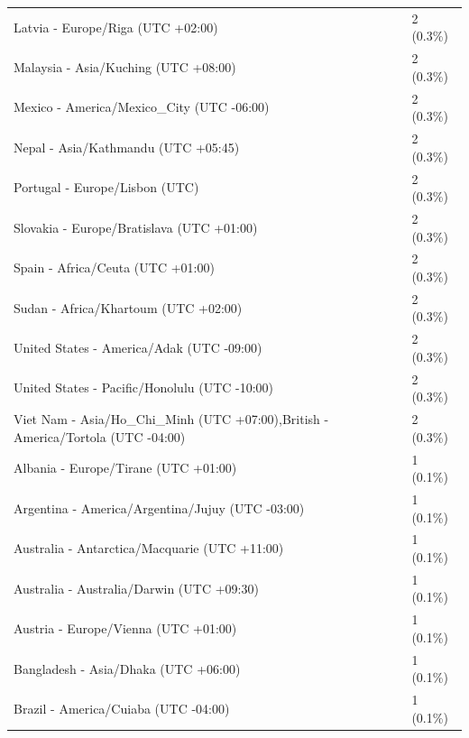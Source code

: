 \begin{appendix}
\begin{table}
{\begin{tabular}[t]{ll}
\hspace{1em}Latvia - Europe/Riga (UTC +02:00) & 2 (0.3\%)\\
\hspace{1em}Malaysia - Asia/Kuching (UTC +08:00) & 2 (0.3\%)\\
\addlinespace
\hspace{1em}Mexico - America/Mexico\_City (UTC -06:00) & 2 (0.3\%)\\
\hspace{1em}Nepal - Asia/Kathmandu (UTC +05:45) & 2 (0.3\%)\\
\hspace{1em}Portugal - Europe/Lisbon (UTC) & 2 (0.3\%)\\
\hspace{1em}Slovakia - Europe/Bratislava (UTC +01:00) & 2 (0.3\%)\\
\hspace{1em}Spain - Africa/Ceuta (UTC +01:00) & 2 (0.3\%)\\
\addlinespace
\hspace{1em}Sudan - Africa/Khartoum (UTC +02:00) & 2 (0.3\%)\\
\hspace{1em}United States - America/Adak (UTC -09:00) & 2 (0.3\%)\\
\hspace{1em}United States - Pacific/Honolulu (UTC -10:00) & 2 (0.3\%)\\
\hspace{1em}Viet Nam - Asia/Ho\_Chi\_Minh (UTC +07:00),British - America/Tortola (UTC -04:00) & 2 (0.3\%)\\
\hspace{1em}Albania - Europe/Tirane (UTC +01:00) & 1 (0.1\%)\\
\addlinespace
\hspace{1em}Argentina - America/Argentina/Jujuy (UTC -03:00) & 1 (0.1\%)\\
\hspace{1em}Australia - Antarctica/Macquarie (UTC +11:00) & 1 (0.1\%)\\
\hspace{1em}Australia - Australia/Darwin (UTC +09:30) & 1 (0.1\%)\\
\hspace{1em}Austria - Europe/Vienna (UTC +01:00) & 1 (0.1\%)\\
\hspace{1em}Bangladesh - Asia/Dhaka (UTC +06:00) & 1 (0.1\%)\\
\addlinespace
\hspace{1em}Brazil - America/Cuiaba (UTC -04:00) & 1 (0.1\%)\\

\end{tabular}}
\end{table}
\end{appendix}
